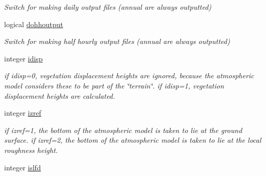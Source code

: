 \begin{DoxyCompactItemize}
\begin{DoxyCompactList}\small\item\em Switch for making daily output files (annual are always outputted) \end{DoxyCompactList}\item 
\hypertarget{structctem__statevars_1_1ctem__switches_afa05112de970ccbf1acb0f8f6fbf5e60}{}logical \hyperlink{structctem__statevars_1_1ctem__switches_afa05112de970ccbf1acb0f8f6fbf5e60}{dohhoutput}\label{structctem__statevars_1_1ctem__switches_afa05112de970ccbf1acb0f8f6fbf5e60}

\begin{DoxyCompactList}\small\item\em Switch for making half hourly output files (annual are always outputted) \end{DoxyCompactList}\item 
\hypertarget{structctem__statevars_1_1ctem__switches_a139d6a743e3a9d7ccfdc57e9c34bf754}{}integer \hyperlink{structctem__statevars_1_1ctem__switches_a139d6a743e3a9d7ccfdc57e9c34bf754}{idisp}\label{structctem__statevars_1_1ctem__switches_a139d6a743e3a9d7ccfdc57e9c34bf754}

\begin{DoxyCompactList}\small\item\em if idisp=0, vegetation displacement heights are ignored, because the atmospheric model considers these to be part of the \char`\"{}terrain\char`\"{}. if idisp=1, vegetation displacement heights are calculated. \end{DoxyCompactList}\item 
\hypertarget{structctem__statevars_1_1ctem__switches_a052e23204e34e46209a60f005e615f29}{}integer \hyperlink{structctem__statevars_1_1ctem__switches_a052e23204e34e46209a60f005e615f29}{izref}\label{structctem__statevars_1_1ctem__switches_a052e23204e34e46209a60f005e615f29}

\begin{DoxyCompactList}\small\item\em if izref=1, the bottom of the atmospheric model is taken to lie at the ground surface. if izref=2, the bottom of the atmospheric model is taken to lie at the local roughness height. \end{DoxyCompactList}\item 
\hypertarget{structctem__statevars_1_1ctem__switches_a88e8d4587a0384b33165265a8ca6f649}{}integer \hyperlink{structctem__statevars_1_1ctem__switches_a88e8d4587a0384b33165265a8ca6f649}{islfd}\label{structctem__statevars_1_1ctem__switches_a88e8d4587a0384b33165265a8ca6f649}


\end{DoxyCompactItemize}
